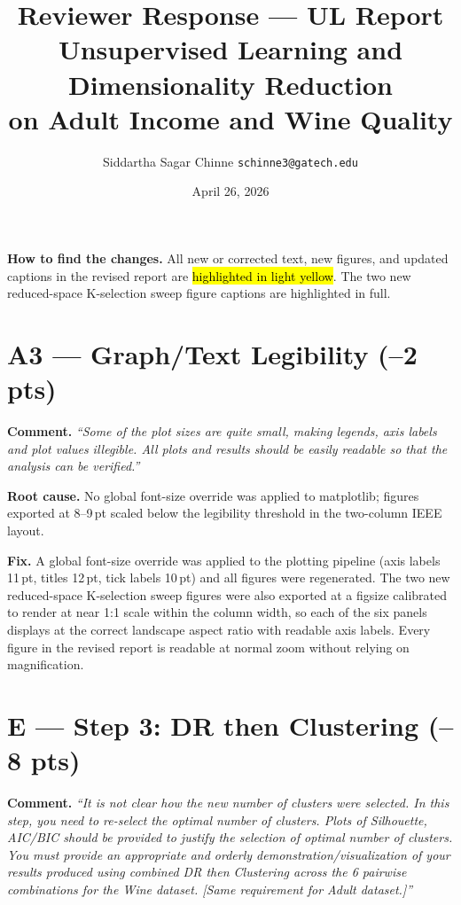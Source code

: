 \documentclass[letterpaper, 10.5pt]{article}
\title{\vspace{-1.5em}Reviewer Response --- UL Report\\[3pt]
\large Unsupervised Learning and Dimensionality Reduction\\
on Adult Income and Wine Quality\vspace{-0.5em}}
\author{Siddartha Sagar Chinne \quad \texttt{schinne3@gatech.edu}}
\date{April 26, 2026\vspace{-1em}}
\begin{document}
\maketitle
\thispagestyle{empty}
\pagestyle{empty}

\noindent\textbf{How to find the changes.}
All new or corrected text, new figures, and updated captions in the revised
report are \hl{highlighted in light yellow}.  The two new reduced-space K-selection sweep figure captions are highlighted in full.

\section*{A3 --- Graph/Text Legibility (--2 pts)}

\textbf{Comment.} \textit{``Some of the plot sizes are quite small, making
legends, axis labels and plot values illegible.  All plots and results should
be easily readable so that the analysis can be verified.''}

\textbf{Root cause.} No global font-size override was applied to matplotlib;
figures exported at 8--9\,pt scaled below the legibility threshold in the
two-column IEEE layout.

\textbf{Fix.} A global font-size override was applied to the plotting
pipeline (axis labels 11\,pt, titles 12\,pt, tick labels 10\,pt) and all
figures were regenerated.  The two new reduced-space K-selection sweep figures
were also exported at a figsize calibrated to render at near 1:1 scale
within the column width, so each of the six panels displays at the
correct landscape aspect ratio with readable axis labels.  Every figure
in the revised report is readable at normal zoom without relying on
magnification.

\section*{E --- Step 3: DR then Clustering (--8 pts)}

\textbf{Comment.} \textit{``It is not clear how the new number of clusters
were selected.  In this step, you need to re-select the optimal number of
clusters.  Plots of Silhouette, AIC/BIC should be provided to justify the
selection of optimal number of clusters.  You must provide an appropriate and
orderly demonstration/visualization of your results produced using combined DR
then Clustering across the 6 pairwise combinations for the Wine dataset.
[Same requirement for Adult dataset.]''}
\end{document}
